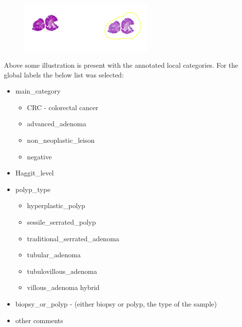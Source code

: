 \documentclass[a4paper,12pt]{article}
\begin{document}
\begin{enumerate}
    \begin{figure}[H]
        \centering
        \includegraphics[width=0.6\textwidth]{annotated.png}
    \end{figure}
    
\end{enumerate}

\par Above some illustration is present with the annotated local categories. For the global labels the below list was selected:

\vspace{4mm}

\begin{itemize}
    \item main\_category
    \begin{itemize}
        \item CRC - colorectal cancer
        \item advanced\_adenoma
        \item non\_neoplastic\_leison
        \item negative
    \end{itemize}
    \item Haggit\_level \cite{aarons2014management}
    \item polyp\_type
    \begin{itemize}
        \item hyperplastic\_polyp
        \item sessile\_serrated\_polyp
        \item traditional\_serrated\_adenoma
        \item tubular\_adenoma
        \item tubulovillous\_adenoma
        \item villous\_adenoma
        \iteme hybrid
    \end{itemize}
    \item biopsy\_or\_polyp - (either biopsy or polyp, the type of the sample)
    \item other comments
\end{itemize}

\vspace{4mm}
\end{document}
